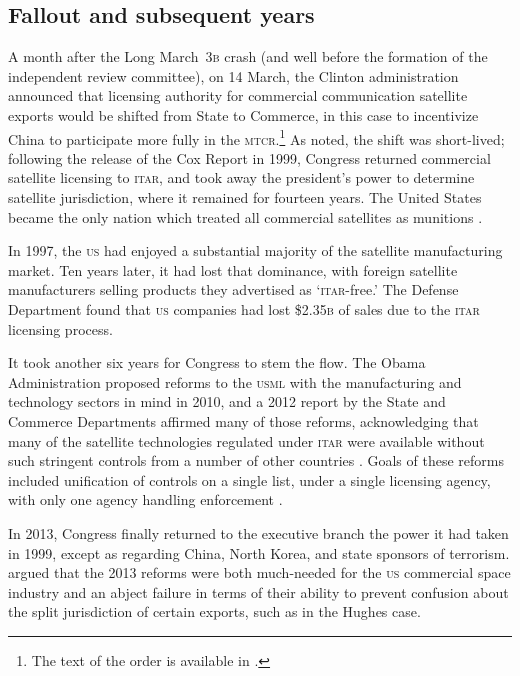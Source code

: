 \documentclass[preprint,twocolumn,5p]{elsarticle}
\begin{document}
\subsection{Fallout and subsequent years}
A month after the Long March~\textsc{3b} crash (and well before the formation of the independent review committee), on 14 March, the Clinton administration announced that licensing authority for commercial communication satellite exports would be shifted from State to Commerce, in this case to incentivize China to participate more fully in the \textsc{mtcr}.\footnote{The text of the order is available in \citet{State61FR56894_1996}.} As \citet{Zinger2015} noted, the shift was short-lived; following the release of the Cox Report in 1999, Congress returned commercial satellite licensing to \textsc{itar}, and took away the president's power to determine satellite jurisdiction, where it remained for fourteen years. The United States became the only nation which treated all commercial satellites as munitions \citep{Section1248}.

In 1997, the \textsc{us} had enjoyed a substantial majority of the satellite manufacturing market. Ten years later, it had lost that dominance, with foreign satellite manufacturers selling products they advertised as `\textsc{itar}-free.' The Defense Department found that \textsc{us} companies had lost \$2.35\textsc{b} of sales due to the \textsc{itar} licensing process. \citep{AFRL2007}

It took another six years for Congress to stem the flow. The Obama Administration proposed reforms to the \textsc{usml} with the manufacturing and technology sectors in mind in 2010, and a 2012 report by the State and Commerce Departments affirmed many of those reforms, acknowledging that many of the satellite technologies regulated under \textsc{itar} were available without such stringent controls from a number of other countries \citep{Section1248}. Goals of these reforms included unification of controls on a single list, under a single licensing agency, with only one agency handling enforcement \citep{Fergusson2020}.

In 2013, Congress finally returned to the executive branch the power it had taken in 1999, except as regarding China, North Korea, and state sponsors of terrorism. \citet{Zinger2015} argued that the 2013 reforms were both much-needed for the \textsc{us} commercial space industry and an abject failure in terms of their ability to prevent confusion about the split jurisdiction of certain exports, such as in the Hughes case.
\end{document}
